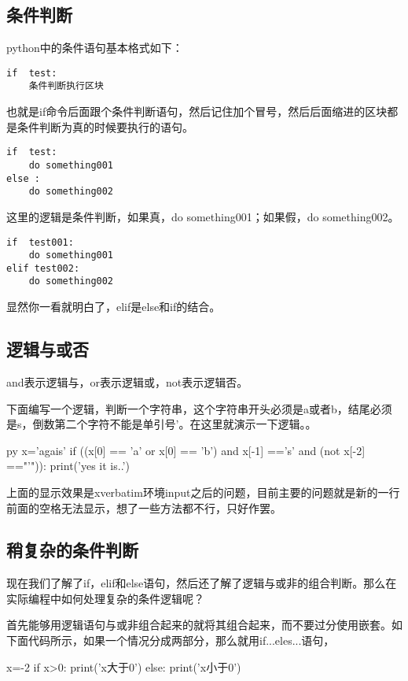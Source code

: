 \documentclass[12pt,oneside]{book}
\begin{document}
\begin{common-format}
\section{条件判断}
python中的条件语句基本格式如下：
\begin{Verbatim}
if  test:
    条件判断执行区块
\end{Verbatim}
也就是if命令后面跟个条件判断语句，然后记住加个冒号，然后后面缩进的区块都是条件判断为真的时候要执行的语句。

\begin{Verbatim}
if  test:
    do something001
else :
    do something002
\end{Verbatim}
这里的逻辑是条件判断，如果真，do something001；如果假，do something002。

\begin{Verbatim}
if  test001:
    do something001
elif test002:
    do something002
\end{Verbatim}
显然你一看就明白了，elif是else和if的结合。






\subsection{逻辑与或否}
and表示逻辑与，or表示逻辑或，not表示逻辑否。

下面编写一个逻辑，判断一个字符串，这个字符串开头必须是a或者b，结尾必须是s，倒数第二个字符不能是单引号'。在这里就演示一下逻辑。。
\begin{xverbatim}[129]{py}
x='agais'
if ((x[0] == 'a' or x[0] == 'b')
    and x[-1] =='s'
    and (not x[-2] =="'")):
    print('yes it is..')
\end{xverbatim}
上面的显示效果是xverbatim环境input之后的问题，目前主要的问题就是新的一行前面的空格无法显示，想了一些方法都不行，只好作罢。


\subsection{稍复杂的条件判断}
现在我们了解了if，elif和else语句，然后还了解了逻辑与或非的组合判断。那么在实际编程中如何处理复杂的条件逻辑呢？

首先能够用逻辑语句与或非组合起来的就将其组合起来，而不要过分使用嵌套。如下面代码所示，如果一个情况分成两部分，那么就用if...eles...语句，
\begin{tcbpython}[]
x=-2
if x>0:
    print('x大于0')
else:
    print('x小于0')
\end{tcbpython}


\end{common-format}
\end{document}

